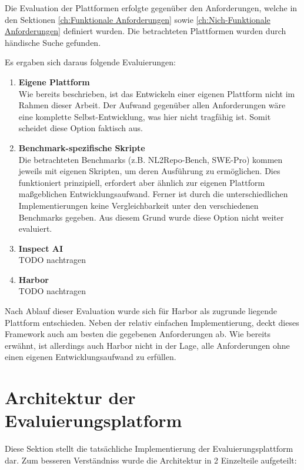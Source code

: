 Die Evaluation der Plattformen erfolgte gegenüber den Anforderungen, welche in den Sektionen \ref{ch:Funktionale Anforderungen} sowie \ref{ch:Nich-Funktionale Anforderungen} definiert wurden. Die betrachteten Plattformen wurden durch händische Suche gefunden.

Es ergaben sich daraus folgende Evaluierungen:

\begin{enumerate}
    \item \textbf{Eigene Plattform} \\ Wie bereits beschrieben, ist das Entwickeln einer eigenen Plattform nicht im Rahmen dieser Arbeit. Der Aufwand gegenüber allen Anforderungen wäre eine komplette Selbst-Entwicklung, was hier nicht tragfähig ist. Somit scheidet diese Option faktisch aus.
    \item \textbf{Benchmark-spezifische Skripte} \\ Die betrachteten Benchmarks (z.B. NL2Repo-Bench, SWE-Pro) kommen jeweils mit eigenen Skripten, um deren Ausführung zu ermöglichen. Dies funktioniert prinzipiell, erfordert aber ähnlich zur eigenen Plattform maßgeblichen Entwicklungsaufwand. Ferner ist durch die unterschiedlichen Implementierungen keine Vergleichbarkeit unter den verschiedenen Benchmarks gegeben. Aus diesem Grund wurde diese Option nicht weiter evaluiert.
    \item \textbf{Inspect AI} \\ TODO nachtragen
    \item \textbf{Harbor} \\ TODO nachtragen
\end{enumerate}

Nach Ablauf dieser Evaluation wurde sich für Harbor als zugrunde liegende Plattform entschieden. Neben der relativ einfachen Implementierung, deckt dieses Framework auch am besten die gegebenen Anforderungen ab. Wie bereits erwähnt, ist allerdings auch Harbor nicht in der Lage, alle Anforderungen ohne einen eigenen Entwicklungsaufwand zu erfüllen. 


\section{Architektur der Evaluierungsplatform}\label{ch:Architektur der Evaluierungsplatform}

Diese Sektion stellt die tatsächliche Implementierung der Evaluierungsplattform dar. Zum besseren Verständniss wurde die Architektur in 2 Einzelteile aufgeteilt:

